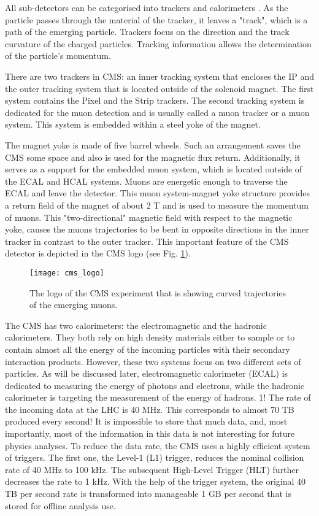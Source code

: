 \begin{normalsize}
All sub-detectors can be categorised into trackers and calorimeters \cite{Hauptman:2011zza}. As the particle passes through the material of the tracker, it leaves a "track", which is a path of the emerging particle. Trackers focus on the direction and the track curvature of the charged particles. Tracking information allows the determination of the particle's momentum. 

There are two trackers in CMS: an inner tracking system that encloses the IP and the outer tracking system that is located outside of the solenoid magnet. The first system contains the Pixel and the Strip trackers. The second tracking system is dedicated for the muon detection and is usually called a muon tracker or a muon system. This system is embedded within a steel yoke of the magnet. 

The magnet yoke is made of five barrel wheels. Such an arrangement saves the CMS some space and also is used for the magnetic flux return. Additionally, it serves as a support for the embedded muon system, which is located outside of the ECAL and HCAL systems. Muons are energetic enough to traverse the ECAL and leave the detector. This muon system-magnet yoke structure provides a return field of the magnet of about 2 T and is used to measure the momentum of muons. This "two-directional" magnetic field with respect to the magnetic yoke, causes the muons trajectories to be bent in opposite directions in the inner tracker in contrast to the outer tracker. This important feature of the CMS detector is depicted in the CMS logo (see Fig. \ref{cms_logo}). 

\begin{figure}[H]
  \centering
  \texttt{[image: cms\_logo]}
  \caption{The logo of the CMS experiment that is showing curved trajectories of the emerging muons.}
  \label{cms_logo}
\end{figure}


The CMS has two calorimeters: the electromagnetic and the hadronic calorimeters. They both rely on high density materials either to sample or to contain almost all the energy of the incoming particles with their secondary interaction products. However, these two systems focus on two different sets of particles. As will be discussed later, electromagnetic calorimeter (ECAL) is dedicated to measuring the energy of photons and electrons, while the hadronic calorimeter is targeting the measurement of the energy of hadrons.
1!
The rate of the incoming data at the LHC is 40 MHz. This corresponds to almost 70 TB produced every second! It is impossible to store that much data, and, most importantly, most of the information in this data is not interesting for future physics analyses. To reduce the data rate, the CMS uses a highly efficient system of triggers. The first one, the Level-1 (L1) trigger, reduces the nominal collision rate of 40 MHz to 100 kHz. The subsequent High-Level Trigger (HLT) further decreases the rate to 1 kHz. With the help of the trigger system, the original 40 TB per second rate is transformed into manageable 1 GB per second that is stored for offline analysis use. 


\end{normalsize}

